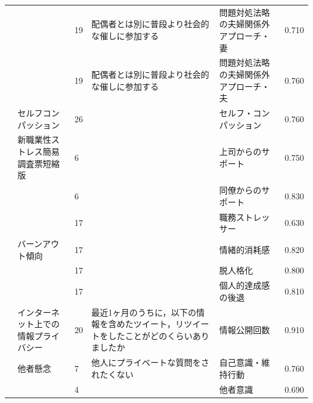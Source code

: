 \begin{landscape}
\begin{longtable}{p{2cm}p{2cm}p{2cm}p{6cm}p{2cm}p{2cm}}
		                         &                                  & 19  & 配偶者とは別に普段より社会的な催しに参加する                              & 問題対処法略の夫婦関係外アプローチ・妻  & 0.710      \\
		                         &                                  & 19  & 配偶者とは別に普段より社会的な催しに参加する                              & 問題対処法略の夫婦関係外アプローチ・夫  & 0.760      \\
		\textcite{Mizuno202192}     & セルフコンパッション                       & 26  &                                                     & セルフ・コンパッション          & 0.760      \\
		                         & 新職業性ストレス簡易調査票短縮版                 & 6   &                                                     & 上司からのサポート            & 0.750      \\
		                         &                                  & 6   &                                                     & 同僚からのサポート            & 0.830      \\
		                         &                                  & 17  &                                                     & 職務ストレッサー             & 0.630      \\
		                         & バーンアウト傾向                         & 17  &                                                     & 情緒的消耗感               & 0.820      \\
		                         &                                  & 17  &                                                     & 脱人格化                 & 0.800      \\
		                         &                                  & 17  &                                                     & 個人的達成感の後退            & 0.810      \\
		\textcite{Tabata202192}     & インターネット上での情報プライバシー               & 20  & 最近1ヶ月のうちに，以下の情報を含めたツイート，リツイートをしたことがどのくらいありましたか      & 情報公開回数               & 0.910      \\
		                         & 他者懸念                             & 7   & 他人にプライベートな質問をされたくない                                 & 自己意識・維持行動            & 0.760      \\
		                         &                                  & 4   &                                                     & 他者意識                 & 0.690      \\

\end{longtable}
\end{landscape}
